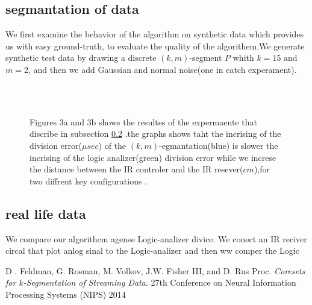 \documentclass{vldb}
\begin{document}
\subsection{segmantation of data}
We first examine the behavior of the algorithm on synthetic data which provides us with
easy ground-truth, to evaluate the quality of the algorithem.We generate synthetic test data by drawing a discrete $(k,m)$-segment $P$ whith $k=15$ and $m=2$, and then we add Gaussian and normal noise(one in eatch experament).


\begin{figure}[H]
\centering
{}  \\
\\

\caption{Figures 3a and 3b shows the resultes of the expermaente that discribe in subsection \ref{IR} .the graphs shows taht the incrising of the division error($\mu sec$) of the $(k,m)$-egmantation(blue) is slower  the incrising of the logic analizer(green) division error while we increse the distance between the IR controler and the IR resever($cm$),for two diffrent key configurations .}
\end{figure}
\subsection{real life data}\label{IR}
We compare our algorithem agense Logic-analizer divice. We conect an IR reciver circal that plot anlog sinal to the Logic-analizer and then ww comper the Logic 
\medskip

\begin{thebibliography}{9}
D . Feldman, G. Rosman, M. Volkov, J.W. Fisher III, and D. Rus
Proc. 
\textit{Coresets for $k$-Segmentation of Streaming Data}. 
27th Conference on Neural Information Processing Systems (NIPS) 2014
 
\end{thebibliography}
\end{document}
